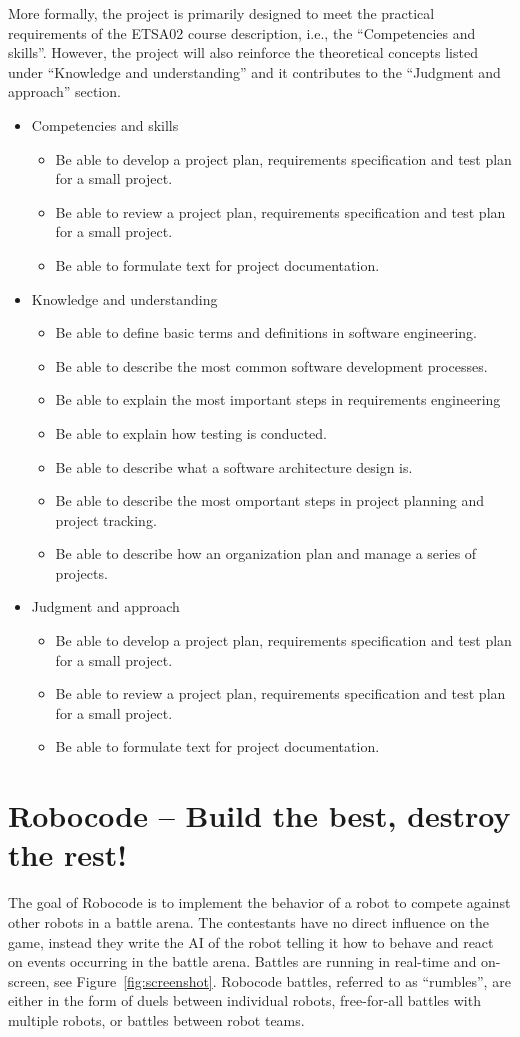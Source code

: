 \documentclass{scrreprt}
\begin{document}
More formally, the project is primarily designed to meet the practical requirements of the ETSA02 course description, i.e., the ``Competencies and skills''. However, the project will also reinforce the theoretical concepts listed under ``Knowledge and understanding'' and it contributes to the ``Judgment and approach'' section.
\begin{itemize}
\item Competencies and skills
\begin{itemize}
\item Be able to develop a project plan, requirements specification and test plan for a small project.
\item Be able to review a project plan, requirements specification and test plan for a small project.
\item Be able to formulate text for project documentation.
\end{itemize}
\item Knowledge and understanding
\begin{itemize}
\item Be able to define basic terms and definitions in software engineering.
\item Be able to describe the most common software development processes.
\item Be able to explain the most important steps in requirements engineering
\item Be able to explain how testing is conducted.
\item Be able to describe what a software architecture design is.
\item Be able to describe the most omportant steps in project planning and project tracking.
\item Be able to describe how an organization plan and manage a series of projects.
\end{itemize}
\item Judgment and approach
\begin{itemize}
\item Be able to develop a project plan, requirements specification and test plan for a small project.
\item Be able to review a project plan, requirements specification and test plan for a small project.
\item Be able to formulate text for project documentation.
\end{itemize}
\end{itemize}

\section{Robocode -- Build the best, destroy the rest!}
The goal of Robocode is to implement the behavior of a robot to compete against other robots in a battle arena. The contestants have no direct influence on the game, instead they write the AI of the robot telling it how to behave and react on events occurring in the battle arena. Battles are running in real-time and on-screen, see Figure~\ref{fig:screenshot}. Robocode battles, referred to as ``rumbles'', are either in the form of duels between individual robots, free-for-all battles with multiple robots, or battles between robot teams.
\end{document}
